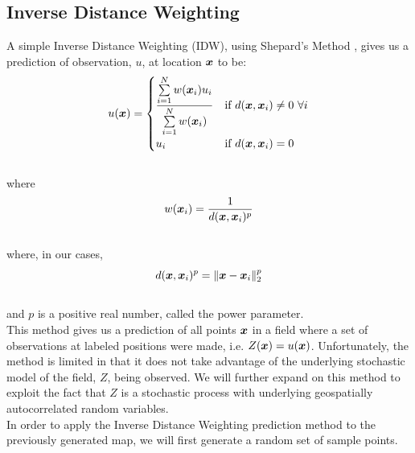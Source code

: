 \documentclass[11pt]{ucthesis}
\newcommand{\vect}[1]{{\it{\boldsymbol{#1}}}}
\begin{document}
\subsection{Inverse Distance Weighting}
A simple Inverse Distance Weighting (IDW), using Shepard's Method \cite{shepard:idw}, gives us a prediction of observation, $u$, at location $\vect{x}$ to be:
\begin{equation}
	u(\vect{x})=\begin{cases}
			\dfrac{\sum\limits_{i=1}^N w(\vect{x}_i)u_i}{\sum\limits_{i=1}^{N} w(\vect{x}_i)} & \text{if}\ d(\vect{x},\vect{x}_i) \neq 0\ \forall i \\
			u_i & \text{if}\ d(\vect{x},\vect{x}_{i})=0\\
		\end{cases}
\end{equation}\\
where\\
\begin{equation}
	w(\vect{x}_i)=\frac{1}{d(\vect{x},\vect{x}_{i})^{p}}
\end{equation}\\
where, in our cases,\\
\begin{equation}
	d(\vect{x},\vect{x}_{i})^{p} = \|\vect{x}-\vect{x}_i\|_{2}^p
\end{equation}\\
and $p$ is a positive real number, called the power parameter.\\
This method gives us a prediction of all points $\vect{x}$ in a field where a set of observations at labeled positions were made, i.e. $Z(\vect{x})=u(\vect{x})$. Unfortunately, the method is limited in that it does not take advantage of the underlying stochastic model of the field, $Z$, being observed. We will further expand on this method to exploit the fact that $Z$ is a stochastic process with underlying geospatially autocorrelated random variables.\\
In order to apply the Inverse Distance Weighting prediction method to the previously generated map, we will first generate a random set of sample points.
\end{document}
